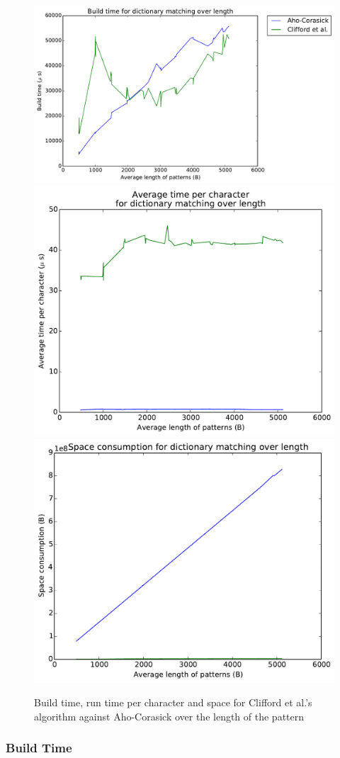 \documentclass[ %
                    author={Dominic Joseph Moylett},
                    degree={MEng},
                     title={Dictionary Matching with Fingerprints},
                  subtitle={An Empirical Analysis},
                      type={research},
                      year={2015} ]{dissertation}
\begin{document}
\begin{figure}[t]
\begin{center}
  \includegraphics[width=0.7\linewidth]{build_length_1000_10000}\\
  \includegraphics[width=0.5\linewidth]{time_length_1000_10000}\includegraphics[width=0.5\linewidth]{size_length_1000_10000}
\end{center}
\caption{Build time, run time per character and space for Clifford et al.'s algorithm against Aho-Corasick over the length of the pattern}
\label{fig:long-pattern-results}
\end{figure}

\subsubsection{Build Time}
\end{document}
